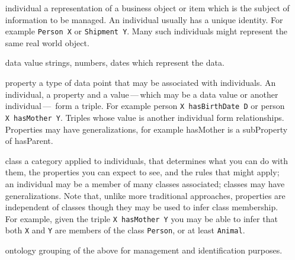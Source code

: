 \begin{itemize}[leftmargin=.8in,font=\itshape]
    \item [individual] a representation of a business object or item which is the subject of information to be managed.
                       An individual usually has a unique identity.
                       For example \lstinline|Person X| or \lstinline|Shipment Y|.
                       Many such individuals might represent the same real world object.
    \item [data value] strings, numbers, dates which represent the data.
    \item [property]   a type of data point that may be associated with individuals.
                       An individual, a property and a value\,---\,which may be a data value or another
                       individual\,---\, form a triple.\newline
                       For example person \lstinline|X hasBirthDate D| or person \lstinline|X hasMother Y|.
                       Triples whose value is another individual form relationships.
                       Properties may have generalizations, for example hasMother is a subProperty of hasParent.
    \item [class]      a category applied to individuals, that determines what you can do with them,
                       the properties you can expect to see, and the rules that might apply;
                       an individual may be a member of many classes associated;
                       classes may have generalizations.
                       Note that, unlike more traditional approaches, properties are independent of classes though
                       they may be used to infer class membership.
                       For example, given the triple \lstinline|X hasMother Y| you may be able to infer that both
                       \lstinline|X| and \lstinline|Y| are members of the class \lstinline|Person|,
                       or at least \lstinline|Animal|.
    \item [ontology]   grouping of the above for management and identification purposes.
\end{itemize}



\ekgmmCapabilitySectionDimensions

